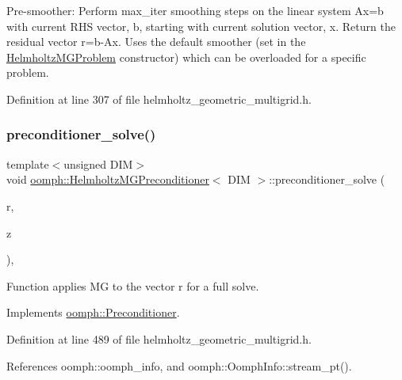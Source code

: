 Pre-\/smoother\+: Perform \textquotesingle{}max\+\_\+iter\textquotesingle{} smoothing steps on the linear system Ax=b with current R\+HS vector, b, starting with current solution vector, x. Return the residual vector r=b-\/\+Ax. Uses the default smoother (set in the \hyperlink{classoomph_1_1HelmholtzMGProblem}{Helmholtz\+M\+G\+Problem} constructor) which can be overloaded for a specific problem. 



Definition at line 307 of file helmholtz\+\_\+geometric\+\_\+multigrid.\+h.

\mbox{\label{classoomph_1_1HelmholtzMGPreconditioner_a20e891e7a2d84f81fc56a003d7f2925f}} 
\subsubsection{\texorpdfstring{preconditioner\+\_\+solve()}{preconditioner\_solve()}}
{\footnotesize\ttfamily template$<$unsigned D\+IM$>$ \\
void \hyperlink{classoomph_1_1HelmholtzMGPreconditioner}{oomph\+::\+Helmholtz\+M\+G\+Preconditioner}$<$ D\+IM $>$\+::preconditioner\+\_\+solve (\begin{DoxyParamCaption}\item[{const \hyperlink{classoomph_1_1DoubleVector}{Double\+Vector} \&}]{r,  }\item[{\hyperlink{classoomph_1_1DoubleVector}{Double\+Vector} \&}]{z }\end{DoxyParamCaption})\hspace{0.3cm}{\ttfamily [inline]}, {\ttfamily [virtual]}}



Function applies MG to the vector r for a full solve. 



Implements \hyperlink{classoomph_1_1Preconditioner_ace1199369e4465cd2b9a34884bb64ec8}{oomph\+::\+Preconditioner}.



Definition at line 489 of file helmholtz\+\_\+geometric\+\_\+multigrid.\+h.



References oomph\+::oomph\+\_\+info, and oomph\+::\+Oomph\+Info\+::stream\+\_\+pt().

